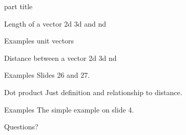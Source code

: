 \documentclass{beamer}
\begin{document}
\begin{frame}
  \begin{beamercolorbox}[sep=12pt,center]{part title}
    \insertsection\par
  \end{beamercolorbox}
\end{frame}

\begin{frame}{Length of a vector}
  2d 3d and nd
\end{frame}

\begin{frame}{Examples}
  unit vectors
\end{frame}

\begin{frame}{Distance between a vector}
  2d 3d nd
\end{frame}

\begin{frame}{Examples}
  Slides 26 and 27.
\end{frame}

\begin{frame}{Dot product}
  Just definition and relationship to distance.
\end{frame}

\begin{frame}{Examples}
  The simple example on slide 4.
\end{frame}

\begin{frame}
  Questions?
\end{frame}
\end{document}
